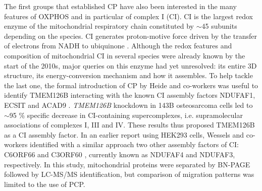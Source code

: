 The first groups that established CP have also been interested in the many features of OXPHOS and in particular of complex I (CI). CI is the largest redox enzyme of the mitochondrial respiratory chain constituted by $\sim$45 subunits depending on the species. CI generates proton-motive force driven by the transfer of electrons from NADH to ubiquinone \cite{Hirst_2013}. Although the redox features and composition of mitochondrial CI in several species were already known by the start of the 2010s, major queries on this enzyme had yet unresolved: its entire 3D structure, its energy-conversion mechanism and how it assembles. To help tackle the last one, the formal introduction of CP by Heide and co-workers was useful to identify TMEM126B interacting with the known CI assembly factors NDUFAF1, ECSIT and ACAD9 \cite{Heide_2012}. \emph{TMEM126B} knockdown in 143B osteosarcoma cells led to $\sim$95 \% specific decrease in CI-containing supercomplexes, i.e. supramolecular associations of complexes I, III and IV. These results thus proposed TMEM126B as a CI assembly factor. In an earlier report using HEK293 cells, Wessels and co-workers identified with a similar approach two other assembly factors of CI: C6ORF66 and C3ORF60 \cite{Wessels_2009}, currently known as NDUFAF4 and NDUFAF3, respectively. In this study, mitochondrial proteins were separated by BN-PAGE followed by LC-MS/MS identification, but comparison of migration patterns was limited to the use of PCP.

